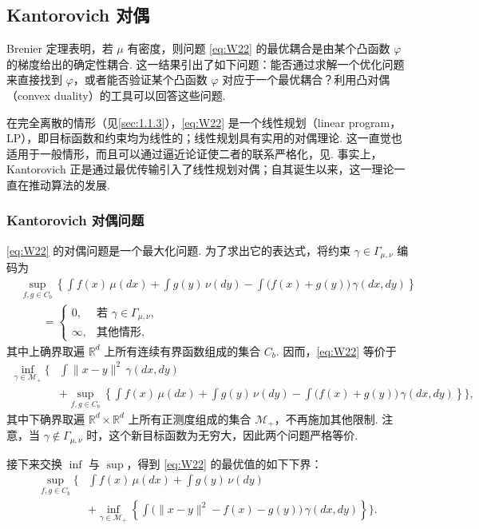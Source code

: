 \subsection{Kantorovich 对偶}\label{sec:1.5}

Brenier 定理表明，若 $\mu$ 有密度，则问题 \eqref{eq:W22} 的最优耦合是由某个凸函数 $\varphi$ 的梯度给出的确定性耦合. 这一结果引出了如下问题：能否通过求解一个优化问题来直接找到 $\varphi$，或者能否验证某个凸函数 $\varphi$ 对应于一个最优耦合？利用凸对偶（convex duality）的工具可以回答这些问题.

在完全离散的情形（见\autoref{sec:1.1.3}），\eqref{eq:W22} 是一个线性规划（linear program，LP），即目标函数和约束均为线性的；线性规划具有实用的对偶理论. 这一直觉也适用于一般情形，而且可以通过逼近论证使二者的联系严格化，见\cite[第 11 章]{ref123}. 事实上，Kantorovich 正是通过最优传输引入了线性规划对偶；自其诞生以来，这一理论一直在推动算法的发展.

\subsubsection{Kantorovich 对偶问题}\label{sec:1.5.1}

\eqref{eq:W22} 的对偶问题是一个最大化问题. 为了求出它的表达式，将约束 $\gamma\in\Gamma_{\mu,\nu}$ 编码为
$$
\begin{aligned}
&\sup_{f,g\in C_b}\left\{
\int f(x)\,\mu(dx)+\int g(y)\,\nu(dy)
-\int\bigl(f(x)+g(y)\bigr)\,\gamma(dx,dy)\right\}\\
&\qquad=\begin{cases}
0,&\text{若 }\gamma\in\Gamma_{\mu,\nu},\\
\infty,&\text{其他情形},
\end{cases}
\end{aligned}
$$
其中上确界取遍 $\mathbb{R}^d$ 上所有连续有界函数组成的集合 $C_b$. 因而，\eqref{eq:W22} 等价于
$$
\begin{aligned}
\inf_{\gamma\in\mathcal{M}_+}\Biggl\{
&\int\|x-y\|^2\,\gamma(dx,dy)\\
&+\sup_{f,g\in C_b}\left\{
\int f(x)\,\mu(dx)+\int g(y)\,\nu(dy)
-\int\bigl(f(x)+g(y)\bigr)\,\gamma(dx,dy)\right\}\Biggr\},
\end{aligned}
$$
其中下确界取遍 $\mathbb{R}^d\times\mathbb{R}^d$ 上所有正测度组成的集合 $\mathcal{M}_+$，不再施加其他限制. 注意，当 $\gamma\notin\Gamma_{\mu,\nu}$ 时，这个新目标函数为无穷大，因此两个问题严格等价.

接下来交换 $\inf$ 与 $\sup$，得到 \eqref{eq:W22} 的最优值的如下下界：
\begin{equation}\label{eq:1.15}
\begin{aligned}
\sup_{f,g\in C_b}\Biggl\{
&\int f(x)\,\mu(dx)+\int g(y)\,\nu(dy)\\
&+\inf_{\gamma\in\mathcal{M}_+}\left\{
\int\bigl(\|x-y\|^2-f(x)-g(y)\bigr)\,\gamma(dx,dy)
\right\}\Biggr\}.
\end{aligned}
\end{equation}

